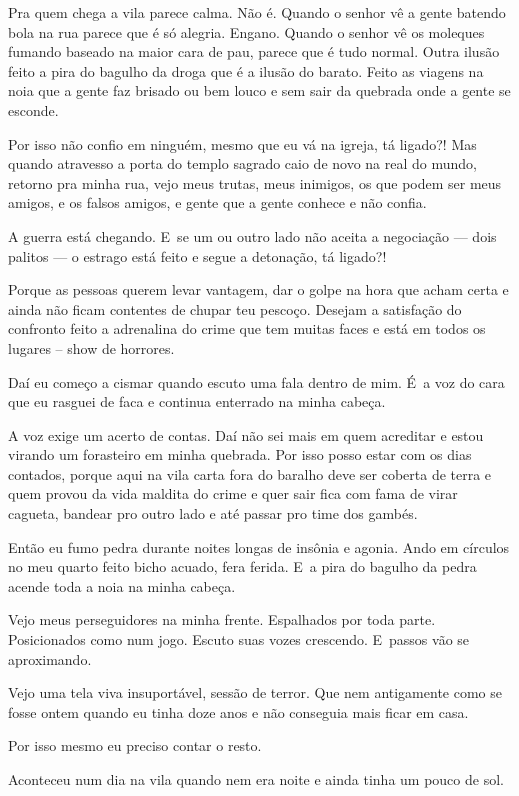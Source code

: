 Pra quem chega a vila parece calma. Não é. Quando o senhor vê a gente
batendo bola na rua parece que é só alegria. Engano. Quando o senhor vê
os moleques fumando baseado na maior cara de pau, parece que é tudo
normal. Outra ilusão feito a pira do bagulho da droga que é a ilusão do
barato. Feito as viagens na noia que a gente faz brisado ou bem louco e
sem sair da quebrada onde a gente se esconde.

Por isso não confio em ninguém, mesmo que eu vá na igreja, tá ligado?!
Mas quando atravesso a porta do templo sagrado caio de novo na real do
mundo, retorno pra minha rua, vejo meus trutas, meus inimigos, os que
podem ser meus amigos, e os falsos amigos, e gente que a gente conhece e
não confia.

A guerra está chegando. E~se um ou outro lado não aceita a negociação
--- dois palitos --- o estrago está feito e segue a detonação, tá
ligado?!

Porque as pessoas querem levar vantagem, dar o golpe na hora que acham
certa e ainda não ficam contentes de chupar teu pescoço. Desejam a
satisfação do confronto feito a adrenalina do crime que tem muitas faces
e está em todos os lugares -- show de horrores.

Daí eu começo a cismar quando escuto uma fala dentro de mim. É~a voz do
cara que eu rasguei de faca e continua enterrado na minha cabeça.

A voz exige um acerto de contas. Daí não sei mais em quem acreditar e
estou virando um forasteiro em minha quebrada. Por isso posso estar com
os dias contados, porque aqui na vila carta fora do baralho deve ser
coberta de terra e quem provou da vida maldita do crime e quer sair fica
com fama de virar cagueta, bandear pro outro lado e até passar pro time
dos gambés.

Então eu fumo pedra durante noites longas de insônia e agonia. Ando em
círculos no meu quarto feito bicho acuado, fera ferida. E~a pira do
bagulho da pedra acende toda a noia na minha cabeça.

Vejo meus perseguidores na minha frente. Espalhados por toda parte.
Posicionados como num jogo. Escuto suas vozes crescendo. E~passos vão se
aproximando.

Vejo uma tela viva insuportável, sessão de terror. Que nem antigamente
como se fosse ontem quando eu tinha doze anos e não conseguia mais ficar
em casa.

Por isso mesmo eu preciso contar o resto.

Aconteceu num dia na vila quando nem era noite e ainda tinha um pouco de
sol.

